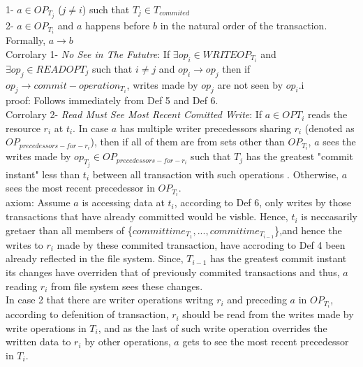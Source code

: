 \documentclass[a4paper, 11pt]{article}
\begin{document}
\hspace{7mm} 1- $a \in OP_{T_j}$ ($j \neq i$) such that $T_j \in T_{commited}$ \\

\hspace{7mm} 2- $a \in OP_{T_i}$ and $a$ happens before $b$ in the natural order of the transaction. Formally, $a \rightarrow b$\\
 

Corrolary 1- \emph{No See in The Fututre}: If $ \exists op_i \in WRITEOP_{T_i}$ and $\exists op_j \in READOP{T_j}$ such that $i \neq j$ and $op_i \rightarrow op_j$ then if $op_j \rightarrow commit-operation_{T_i}$, writes made by $op_j$ are not seen by $op_i$.i\\

proof: Follows immediately from Def 5 and Def 6.\\

Corrolary 2- \emph{Read Must See Most Recent Comitted Write}: If $a \in OP{T_i}$ reads the resource $r_i$ at $t_i$. In case $a$ has multiple writer precedessors sharing $r_i$ (denoted as $OP_{precedessors-for-r_i}$), then if all of them are from sets other than $OP_{T_i}$, $a$ sees the writes made by $op_{T_j} \in OP_{precedessors-for-r_i}$ such that $T_j$ has the greatest "commit instant" less than $t_i$ between all transaction with such operations . Otherwise, $a$ sees the most recent precedessor in $OP_{T_i}$. \\

axiom: Assume $a$ is accessing data at $t_i$, according to Def 6, only writes by those transactions that have already committed would be visble. Hence, $t_i$ is neccasarily gretaer than all members of \{$committime_{T_1}, ..., commitime_{T_{i-1}}$\},and hence the writes to $r_i$ made by these commited transaction, have accroding to Def 4 been already reflected in the file system. Since, $T_{i-1}$ has the greatest commit instant its changes have overriden that of previously commited transactions and thus, $a$ reading $r_i$ from file system sees these changes.\\

In case 2 that there are writer operations writng $r_i$ and preceding $a$ in $OP_{T_i}$, according to defenition of transaction, $r_i$ should be read from the writes made by write operations in $T_i$, and as the last of such write operation overrides the written data to $r_i$ by other operations, $a$ gets to see the most recent precedessor in $T_i$.\\   
\end{document}
